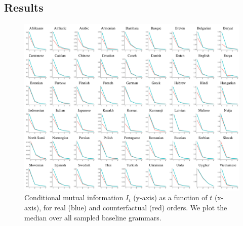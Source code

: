 \subsection{Results}\label{sec:main-experiment-results}

\begin{figure}
	\begin{center}
\includegraphics[width=\textwidth]{it-table.pdf}
\end{center}
	\caption{Conditional mutual information $I_t$ (y-axis) as a function of $t$ (x-axis), for real (blue) and counterfactual (red) orders. We plot the median over all sampled baseline grammars.}\label{fig:it}
\end{figure}



